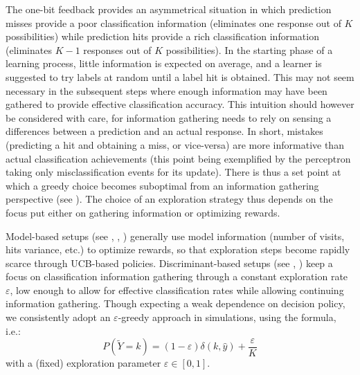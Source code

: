 \documentclass[preprint,12pt,authoryear]{elsarticle}
\begin{document}
The one-bit feedback provides an asymmetrical situation in which prediction misses provide a poor classification information (eliminates one response out of $K$ possibilities) while prediction hits provide a rich classification information (eliminates $K-1$ responses out of $K$ possibilities). 
In the starting phase of a learning process, little information is expected on average, and a learner is suggested to try labels at random until a label hit is obtained. This may not seem necessary in the subsequent steps where enough information may have been gathered to provide effective classification accuracy. 
This intuition should however be considered with care, for information gathering needs to rely on sensing a differences between a prediction and an actual response. {\color{blue} In short, mistakes (predicting a hit and obtaining a miss, or vice-versa) are  more informative than actual classification achievements (this point being exemplified by the perceptron taking only misclassification events for its update). There is thus a set point at which a greedy choice becomes suboptimal from an information gathering perspective (see \cite{kakade2008efficient}).} The choice of an exploration strategy thus depends on the focus put either on gathering information or optimizing rewards. 

Model-based setups (see \cite{lai1985asymptotically}, \cite{auer2003nonstochastic}, \cite{crammer2013multiclass}) generally use model information (number of visits, hits variance, etc.) to optimize rewards, so that exploration steps become rapidly scarce through UCB-based policies. 
Discriminant-based setups (see \cite{kakade2008efficient}, \cite{zhong2015esann}) keep a focus on classification information gathering through  
a constant exploration rate $\varepsilon$, low enough to allow for effective classification rates while allowing continuing information gathering.
Though expecting a weak dependence on decision policy, we consistently adopt an $\varepsilon$-greedy approach in simulations, using the \cite{kakade2008efficient} formula, i.e.:
$$P(\tilde{Y}=k) = (1-\varepsilon) \delta(k,\hat{y}) + \frac{\varepsilon}{K}$$ with a (fixed) exploration parameter $\varepsilon \in [0,1]$.
\end{document}
